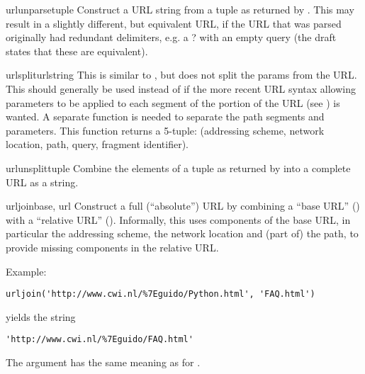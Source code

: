 \begin{funcdesc}{urlunparse}{tuple}
Construct a URL string from a tuple as returned by .
This may result in a slightly different, but equivalent URL, if the
URL that was parsed originally had redundant delimiters, e.g. a ? with
an empty query (the draft states that these are equivalent).
\end{funcdesc}

\begin{funcdesc}{urlsplit}{urlstring}
This is similar to , but does not split the
params from the URL.  This should generally be used instead of
 if the more recent URL syntax allowing
parameters to be applied to each segment of the  portion of
the URL (see ) is wanted.  A separate function is needed to
separate the path segments and parameters.  This function returns a
5-tuple: (addressing scheme, network location, path, query, fragment
identifier).
\end{funcdesc}

\begin{funcdesc}{urlunsplit}{tuple}
Combine the elements of a tuple as returned by 
into a complete URL as a string.
\end{funcdesc}

\begin{funcdesc}{urljoin}{base, url}
Construct a full (``absolute'') URL by combining a ``base URL''
() with a ``relative URL'' ().  Informally, this
uses components of the base URL, in particular the addressing scheme,
the network location and (part of) the path, to provide missing
components in the relative URL.

Example:

\begin{verbatim}
urljoin('http://www.cwi.nl/%7Eguido/Python.html', 'FAQ.html')
\end{verbatim}

yields the string

\begin{verbatim}
'http://www.cwi.nl/%7Eguido/FAQ.html'
\end{verbatim}

The  argument has the same meaning as for
.
\end{funcdesc}

